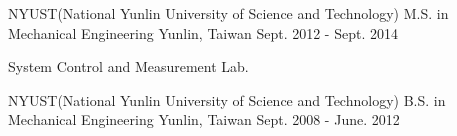 

\begin{cventries}

  \cventry
    {NYUST(National Yunlin University of Science and Technology)}
    {M.S. in Mechanical Engineering}
    {Yunlin, Taiwan} %
    {Sept. 2012 - Sept. 2014} %
    {
      \begin{cvitems} %
        \item {System Control and Measurement Lab.}
      \end{cvitems}
    }

  \cventry
    {NYUST(National Yunlin University of Science and Technology)}
    {B.S. in Mechanical Engineering}
    {Yunlin, Taiwan} %
    {Sept. 2008 - June. 2012} %
    {}

\end{cventries}
